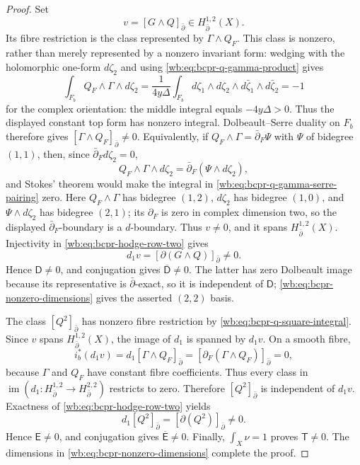 \begin{proof}
Set
\begin{equation}
 v=[G\wedge Q]_{\bar\partial}
 \in H^{1,2}_{\bar\partial}(X).
\label{wb:eq:bcpr-v-class}
\end{equation}
Its fibre restriction is the class represented by
$\Gamma\wedge Q_F$.  This class is nonzero, rather than merely represented
by a nonzero invariant form: wedging with the holomorphic one-form
$d\zeta_2$ and using \cref{wb:eq:bcpr-q-gamma-product} gives
\begin{equation}
 \int_{F_b}Q_F\wedge\Gamma\wedge d\zeta_2
 =\frac1{4y\Delta}
   \int_{F_b}d\zeta_1\wedge d\zeta_2\wedge
                    d\bar\zeta_1\wedge d\bar\zeta_2
 =-1
\label{wb:eq:bcpr-q-gamma-serre-pairing}
\end{equation}
for the complex orientation: the middle integral equals
$-4y\Delta>0$.  Thus the displayed constant top form has nonzero integral.
Dolbeault--Serre duality on $F_b$ therefore gives
$[\Gamma\wedge Q_F]_{\bar\partial}\ne0$.  Equivalently, if
$Q_F\wedge\Gamma=\bar\partial_F\Psi$ with $\Psi$ of bidegree $(1,1)$,
then, since $\bar\partial_Fd\zeta_2=0$,
\[
 Q_F\wedge\Gamma\wedge d\zeta_2
 =\bar\partial_F(\Psi\wedge d\zeta_2),
\]
and Stokes' theorem would make the integral in
\cref{wb:eq:bcpr-q-gamma-serre-pairing} zero.  Here
$Q_F\wedge\Gamma$ has bidegree $(1,2)$,
$d\zeta_2$ has bidegree $(1,0)$, and
$\Psi\wedge d\zeta_2$ has bidegree $(2,1)$; its $\partial_F$ is zero in
complex dimension two, so the displayed $\bar\partial_F$-boundary is a
$d$-boundary.  Thus $v\neq0$, and it spans
$H^{1,2}_{\bar\partial}(X)$.  Injectivity in
\cref{wb:eq:bcpr-hodge-row-two} gives
\begin{equation}
 d_1v=[\partial(G\wedge Q)]_{\bar\partial}\neq0.
\label{wb:eq:bcpr-d-nonzero}
\end{equation}
Hence $\mathsf D\neq0$, and conjugation gives
$\overline{\mathsf D}\neq0$.  The latter has zero Dolbeault image because
its representative is $\bar\partial$-exact, so it is independent of
$\mathsf D$; \cref{wb:eq:bcpr-nonzero-dimensions} gives the asserted
$(2,2)$ basis.

The class $[Q^2]_{\bar\partial}$ has nonzero fibre restriction by
\cref{wb:eq:bcpr-q-square-integral}.  Since $v$ spans
$H^{1,2}_{\bar\partial}(X)$, the image of $d_1$ is spanned by $d_1v$.
On a smooth fibre,
\[
 i_b^*(d_1v)
 =d_1[\Gamma\wedge Q_F]_{\bar\partial}
 =[\partial_F(\Gamma\wedge Q_F)]_{\bar\partial}=0,
\]
because $\Gamma$ and $Q_F$ have constant fibre coefficients.  Thus every
class in $\operatorname{im}(d_1\colon H^{1,2}_{\bar\partial}\to
H^{2,2}_{\bar\partial})$ restricts to zero.
Therefore $[Q^2]_{\bar\partial}$ is independent of $d_1v$.  Exactness of
\cref{wb:eq:bcpr-hodge-row-two} yields
\begin{equation}
 d_1[Q^2]_{\bar\partial}
 =[\partial(Q^2)]_{\bar\partial}\neq0.
\label{wb:eq:bcpr-e-nonzero}
\end{equation}
Hence $\mathsf E\neq0$, and conjugation gives
$\overline{\mathsf E}\neq0$.  Finally, $\int_X\nu=1$ proves
$\mathsf T\neq0$.  The dimensions in
\cref{wb:eq:bcpr-nonzero-dimensions} complete the proof.
\end{proof}

